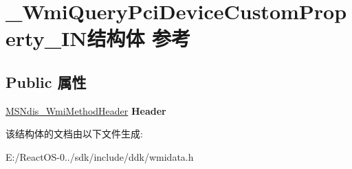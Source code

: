 \hypertarget{struct___wmi_query_pci_device_custom_property___i_n}{}\section{\+\_\+\+Wmi\+Query\+Pci\+Device\+Custom\+Property\+\_\+\+I\+N结构体 参考}
\label{struct___wmi_query_pci_device_custom_property___i_n}
\subsection*{Public 属性}
\begin{DoxyCompactItemize}
\item 
\mbox{\label{struct___wmi_query_pci_device_custom_property___i_n_a262f71c0f3f8fa43abb90cff152c91ed}} 
\hyperlink{struct___m_s_ndis___wmi_method_header}{M\+S\+Ndis\+\_\+\+Wmi\+Method\+Header} {\bfseries Header}
\end{DoxyCompactItemize}


该结构体的文档由以下文件生成\+:\begin{DoxyCompactItemize}
\item 
E\+:/\+React\+O\+S-\/0../sdk/include/ddk/wmidata.\+h\end{DoxyCompactItemize}
